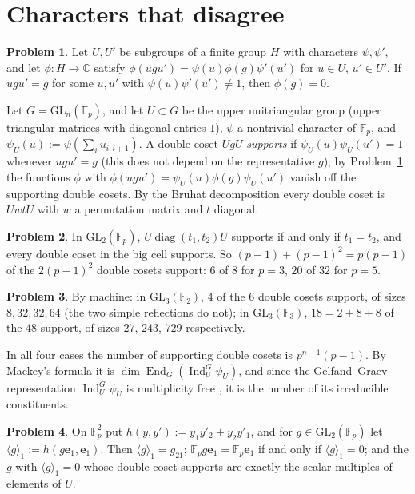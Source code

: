 \documentclass[reqno]{amsart}
\theoremstyle{definition}
\newtheorem{problem}{Problem}[section]
\theoremstyle{plain}
\theoremstyle{remark}
\newcommand{\C}{{\mathbb{C}}}
\newcommand{\F}{{\mathbb{F}}}
\newcommand{\be}{\mathbf e}
\newcommand{\GL}{\mathrm{GL}}
\newcommand{\diag}{\operatorname{diag}}
\begin{document}
\section{Characters that disagree}\label{sec:characters}

\begin{problem}\label{pr:agree}
Let \(U,U'\) be subgroups of a finite group \(H\) with characters \(\psi,\psi'\), and let \(\phi\colon H\to\C\) satisfy \(\phi(ugu')=\psi(u)\phi(g)\psi'(u')\) for \(u\in U\), \(u'\in U'\).  If \(ugu'=g\) for some \(u,u'\) with \(\psi(u)\psi'(u')\ne1\), then \(\phi(g)=0\).
\end{problem}

Let \(G=\GL_n(\F_p)\), and let \(U\subset G\) be the upper unitriangular group (upper triangular matrices with diagonal entries \(1\)), \(\psi\) a nontrivial character of \(\F_p\), and \(\psi_U(u):=\psi(\sum_i u_{i,i+1})\).  A double coset \(UgU\) \emph{supports} if \(\psi_U(u)\psi_U(u')=1\) whenever \(ugu'=g\) (this does not depend on the representative \(g\)); by Problem~\ref{pr:agree} the functions \(\phi\) with \(\phi(ugu')=\psi_U(u)\phi(g)\psi_U(u')\) vanish off the supporting double cosets.  By the Bruhat decomposition every double coset is \(UwtU\) with \(w\) a permutation matrix and \(t\) diagonal.

\begin{problem}\label{pr:gl2-cells}
In \(\GL_2(\F_p)\), \(U\diag(t_1,t_2)U\) supports if and only if \(t_1=t_2\), and every double coset in the big cell supports.  So \((p-1)+(p-1)^2=p(p-1)\) of the \(2(p-1)^2\) double cosets support: \(6\) of \(8\) for \(p=3\), \(20\) of \(32\) for \(p=5\).
\end{problem}

\begin{problem}\label{pr:gl3-cells}
By machine: in \(\GL_3(\F_2)\), \(4\) of the \(6\) double cosets support, of sizes \(8,32,32,64\) (the two simple reflections do not); in \(\GL_3(\F_3)\), \(18=2+8+8\) of the \(48\) support, of sizes \(27\), \(243\), \(729\) respectively.
\end{problem}

In all four cases the number of supporting double cosets is \(p^{n-1}(p-1)\).  By Mackey's formula it is \(\dim\operatorname{End}_G(\operatorname{Ind}_U^G\psi_U)\), and since the Gelfand--Graev representation \(\operatorname{Ind}_U^G\psi_U\) is multiplicity free \cite[\S8.1]{Ca85}, it is the number of its irreducible constituents.

\begin{problem}\label{pr:gl2-frame}
On \(\F_p^2\) put \(h(y,y'):=y_1y'_2+y_2y'_1\), and for \(g\in\GL_2(\F_p)\) let \(\langle g\rangle_1:=h(g\be_1,\be_1)\).  Then \(\langle g\rangle_1=g_{21}\); \(\F_pg\be_1=\F_p\be_1\) if and only if \(\langle g\rangle_1=0\); and the \(g\) with \(\langle g\rangle_1=0\) whose double coset supports are exactly the scalar multiples of elements of \(U\).
\end{problem}
\end{document}
